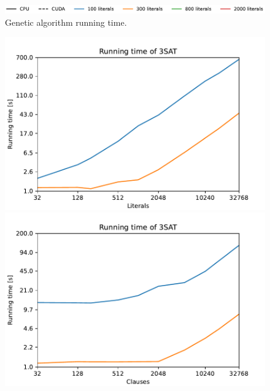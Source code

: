 \begin{figure}[ht!]
    \begin{minipage}[t]{0.7\textwidth}
        \includegraphics[width=\textwidth]{img/runs/time_ga_legend.pdf}
    \end{minipage}

    \caption[Running times of genetic algorithm]{Genetic algorithm running time. }
\end{figure}

\begin{figure}[ht!]
    \centering
    \begin{minipage}[t]{0.9\textwidth}
        \begin{minipage}[t]{0.48\textwidth}
            \includegraphics[width=\textwidth]{img/runs/time_ga_varcount.pdf}
        \end{minipage}
        \begin{minipage}[t]{0.48\textwidth}
            \includegraphics[width=\textwidth]{img/runs/time_ga_clausecount.pdf}
        \end{minipage}
    \end{minipage}


\end{figure}
